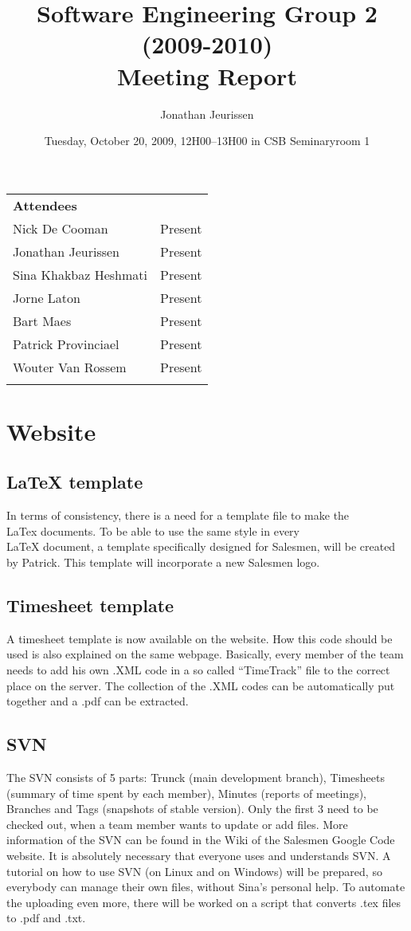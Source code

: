 \documentclass[a4paper, 12pt]{article}
\title{Software Engineering Group 2 (2009-2010) \\Meeting Report}
\author{Jonathan Jeurissen}
\date{ Tuesday, October 20, 2009, 12H00--13H00 in CSB Seminaryroom 1}
\begin{document}
	\maketitle
	
	\begin{tabular}{l l}
		{\large \textbf{Attendees}} \\
		Nick De Cooman & Present \\
		Jonathan Jeurissen & Present \\
		Sina Khakbaz Heshmati & Present \\
		Jorne Laton & Present \\
		Bart Maes & Present \\
		Patrick Provinciael & Present \\
		Wouter Van Rossem & Present \\
		\\
	\end{tabular}	
	
	
	
	
	\section{Website}
	
	\subsection{\LaTeX{} template}
		In terms of consistency, there is a need for a template file to make the \\LaTex{} documents. To be able to use the same style in every \\LaTeX{} document, a template specifically designed for Salesmen, will be created by Patrick. This template will incorporate a new Salesmen logo.
	\subsection{Timesheet template}
A timesheet template is now available on the website\cite{site1}. How this code should be used is also explained on the same webpage. Basically, every member of the team needs to add his own .XML code in a so called ``TimeTrack'' file to the correct place on the server. The collection of the .XML codes can be automatically put together and a .pdf can be extracted.
	\subsection{SVN}
The SVN consists of 5 parts: Trunck (main development branch), Timesheets (summary of time spent by each member), Minutes (reports of meetings), Branches and Tags (snapshots of stable version). Only the first 3 need to be checked out, when a team member wants to update or add files. More information of the SVN can be found in the Wiki of the Salesmen Google Code website\cite{site2}. It is absolutely necessary that everyone uses and understands SVN.
A tutorial on how to use SVN (on Linux and on Windows) will be prepared, so everybody can manage their own files, without Sina's personal help. To automate the uploading even more, there will be worked on a script that converts .tex files to .pdf and .txt.
\end{document}
